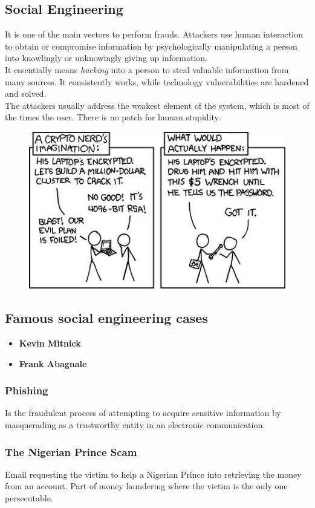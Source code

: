     \subsection{Social Engineering}
        It is one of the main vectors to perform frauds. Attackers use human interaction to obtain or compromise information by psychologically manipulating a person into knowlingly or unknowingly giving up information.\\
        It essentially means \textit{hacking} into a person to steal valuable information from many sources. It consistently works, while technology vulnerabilities are hardened and solved.\\
        The attackers usually address the weakest element of the system, which is most of the times the user. There is no patch for human stupidity.
        \begin{figure}[!ht]
            \centering
            \includegraphics[width=0.45\linewidth]{memes.png}
        \end{figure}
        \subsection{Famous social engineering cases}
            \begin{itemize}
                \item \textbf{Kevin Mitnick}
                \item \textbf{Frank Abagnale}
            \end{itemize}
        \subsubsection{Phishing}
            Is the fraudulent process of attempting to acquire sensitive information by masquerading as a trustworthy entity in an electronic communication.
        \subsubsection{The Nigerian Prince Scam}       
            Email requesting the victim to help a Nigerian Prince into retrieving the money from an account. Part of money laundering where the victim is the only one persecutable.
